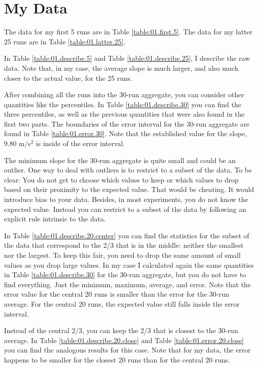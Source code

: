 \section{My Data}
%
The data for my first 5 runs are in Table \ref{table:01.first.5}. The data for my latter 25 runs are in Table \ref{table:01.latter.25}.

In Table \ref{table:01.describe.5} and Table \ref{table:01.describe.25}, I describe the raw data. Note that, in my case, the average slope is much larger, and also much closer to the actual value, for the 25 runs.

After combining all the runs into the 30-run aggregate, you can consider other quantities like the percentiles. In Table \ref{table:01.describe.30} you can find the three percentiles, as well as the previous quantities that were also found in the first two parts. The boundaries of the error interval for the 30-run aggregate are found in Table \ref{table:01.error.30}. Note that the established value for the slope, 9.80 m/s$^{2}$ is inside of the error interval.

The minimum slope for the 30-run aggregate is quite small and could be an outlier. One way to deal with outliers is to restrict to a subset of the data. To be clear: You do not get to choose which values to keep or which values to drop based on their proximity to the expected value. That would be cheating. It would introduce bias to your data. Besides, in most experiments, you do not know the expected value. Instead you can restrict to a subset of the data by following an explicit rule intrinsic to the data.

In Table \ref{table:01.describe.20.center} you can find the statistics for the subset of the data that correspond to the 2/3 that is in the middle: neither the smallest nor the largest. To keep this fair, you need to drop the same amount of small values as you drop large values. In my case I calculated again the same quantities in Table \ref{table:01.describe.30} for the 30-run aggregate, but you do not have to find everything. Just the minimum, maximum, average, and error. Note that the error value for the central 20 runs is smaller than the error for the 30-run average. For the central 20 runs, the expected value still falls inside the error interval.

Instead of the central 2/3, you can keep the 2/3 that is closest to the 30-run average. In Table \ref{table:01.describe.20.close} and Table \ref{table:01.error.20.close} you can find the analogous results for this case. Note that for my data, the error happens to be smaller for the closest 20 runs than for the central 20 runs.

